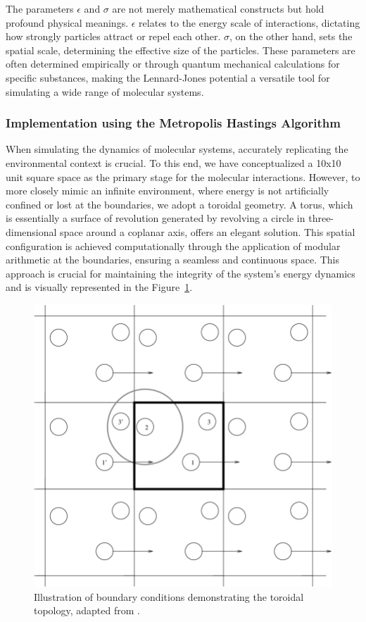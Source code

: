 \documentclass{article}
\begin{document}
The parameters \( \epsilon \) and \( \sigma \) are not merely mathematical constructs but hold profound physical meanings. \( \epsilon \) relates to the energy scale of interactions, dictating how strongly particles attract or repel each other. \( \sigma \), on the other hand, sets the spatial scale, determining the effective size of the particles. These parameters are often determined empirically or through quantum mechanical calculations for specific substances, making the Lennard-Jones potential a versatile tool for simulating a wide range of molecular systems.

\subsubsection{Implementation using the Metropolis Hastings Algorithm}

When simulating the dynamics of molecular systems, accurately replicating the environmental context is crucial. To this end, we have conceptualized a 10x10 unit square space as the primary stage for the molecular interactions. However, to more closely mimic an infinite environment, where energy is not artificially confined or lost at the boundaries, we adopt a toroidal geometry. A torus, which is essentially a surface of revolution generated by revolving a circle in three-dimensional space around a coplanar axis, offers an elegant solution. This spatial configuration is achieved computationally through the application of modular arithmetic at the boundaries, ensuring a seamless and continuous space. This approach is crucial for maintaining the integrity of the system's energy dynamics and is visually represented in the Figure~\ref{fig:boundaryconditions}.

\begin{figure}[H]
	\centering
	\includegraphics[width=0.5\linewidth]{./Figures/MCMC/LennardJones/boundaryconditions.png}
	\caption{Illustration of boundary conditions demonstrating the toroidal topology, adapted from \cite{hunt2003arnold}.}
	\label{fig:boundaryconditions}
\end{figure}
\end{document}
